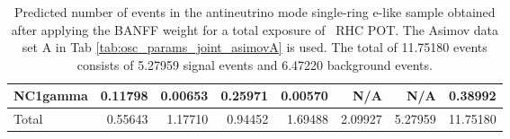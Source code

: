 \begin{table}
\begin{tabular} { | l ||r | r | r | r | r | r | | r | }
	 NC1gamma     & 0.11798              & 0.00653              & 0.25971              & 0.00570              & N/A                  & N/A                  & 0.38992              \\ \hline
	\hline
	 Total        & 0.55643              & 1.17710              & 0.94452              & 1.69488              & 2.09927              & 5.27959              & 11.75180             \\ \hline
	\end{tabular}
	\caption{Predicted number of events in the antineutrino mode single-ring e-like sample obtained after applying the BANFF weight for a total exposure of \TotalPotNuBarRunOneNineC\ RHC POT. The Asimov data set A in Tab \ref{tab:osc_params_joint_asimovA} is used. The total of 11.75180 events consists of 5.27959 signal events and 6.47220 background events.}
	\label{tab:event_rates_exp_RHC1Re}
\end{table}






